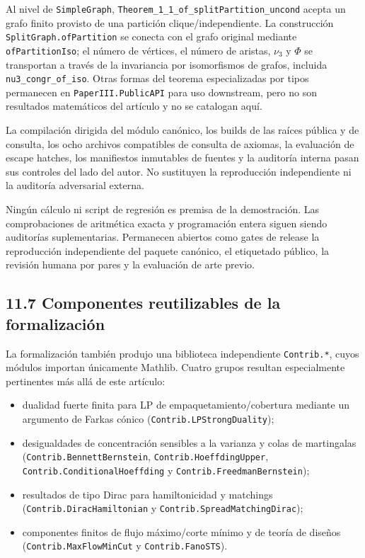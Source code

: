\documentclass[
  spanish,
  11pt,
  a4paper,
]{article}
\providecommand{\tightlist}{%
  \setlength{\itemsep}{0pt}\setlength{\parskip}{0pt}}
\begin{document}
Al nivel de \texttt{SimpleGraph}, \texttt{Theorem\_1\_1\_of\_splitPartition\_uncond} acepta un grafo finito provisto de una partición clique/independiente. La construcción \texttt{SplitGraph.ofPartition} se conecta con el grafo original mediante \texttt{ofPartitionIso}; el número de vértices, el número de aristas, \(\nu_3\) y \(\Phi\) se transportan a través de la invariancia por isomorfismos de grafos, incluida \texttt{nu3\_congr\_of\_iso}. Otras formas del teorema especializadas por tipos permanecen en \texttt{PaperIII.PublicAPI} para uso downstream, pero no son resultados matemáticos del artículo y no se catalogan aquí.

La compilación dirigida del módulo canónico, los builds de las raíces pública y de consulta, los ocho archivos compatibles de consulta de axiomas, la evaluación de escape hatches, los manifiestos inmutables de fuentes y la auditoría interna pasan sus controles del lado del autor. No sustituyen la reproducción independiente ni la auditoría adversarial externa.

Ningún cálculo ni script de regresión es premisa de la demostración. Las comprobaciones de aritmética exacta y programación entera siguen siendo auditorías suplementarias. Permanecen abiertos como gates de release la reproducción independiente del paquete canónico, el etiquetado público, la revisión humana por pares y la evaluación de arte previo.

\subsection{11.7 Componentes reutilizables de la formalización}\label{componentes-reutilizables-de-la-formalizaciuxf3n}

La formalización también produjo una biblioteca independiente \texttt{Contrib.*}, cuyos módulos importan únicamente Mathlib. Cuatro grupos resultan especialmente pertinentes más allá de este artículo:

\begin{itemize}
\tightlist
\item
  dualidad fuerte finita para LP de empaquetamiento/cobertura mediante un argumento de Farkas cónico (\texttt{Contrib.LPStrongDuality});
\item
  desigualdades de concentración sensibles a la varianza y colas de martingalas (\texttt{Contrib.BennettBernstein}, \texttt{Contrib.HoeffdingUpper}, \texttt{Contrib.ConditionalHoeffding} y \texttt{Contrib.FreedmanBernstein});
\item
  resultados de tipo Dirac para hamiltonicidad y matchings (\texttt{Contrib.DiracHamiltonian} y \texttt{Contrib.SpreadMatchingDirac});
\item
  componentes finitos de flujo máximo/corte mínimo y de teoría de diseños (\texttt{Contrib.MaxFlowMinCut} y \texttt{Contrib.FanoSTS}).
\end{itemize}
\end{document}

